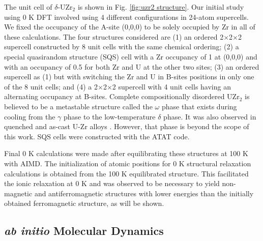 \documentclass[preprint,12pt]{elsarticle}
\begin{document}
The unit cell of $\delta$-UZr$_2$ is shown in Fig. \ref{fig:uzr2 structure}. Our initial study using 0 K DFT involved using 4 different configurations in 24-atom supercells. We fixed the occupancy of the A-site (0,0,0) to be solely occupied by Zr in all of these calculations.
The four structures considered are (1) an ordered 2$\times$2$\times$2 supercell constructed by 8 unit cells with the same chemical ordering; (2) a special quasirandom structure (SQS) cell with a Zr occupancy of 1 at (0,0,0) and with an occupancy of 0.5 for both Zr and U at the other two sites; (3) an ordered supercell as (1) but with switching the Zr and U in B-sites positions in only one of the 8 unit cells; and (4) a 2$\times$2$\times$2 supercell with 4 unit cells having an alternating occupancy at B-sites. Complete compositionally disordered UZr$_2$ is believed to be a metastable structure called the $\omega$ phase that exists during cooling from the $\gamma$ phase to the low-temperature $\delta$ phase. It was also observed in quenched and as-cast U-Zr alloys \cite{irukuvarghula_decomposition_2016}. However, that phase is beyond the scope of this work. SQS cells were constructed with the ATAT code\cite{van_de_walle_alloy_2002,van_de_walle_multicomponent_2009,van_de_walle_efficient_2013}. 

Final 0 K calculations were made after equilibrating these structures at 100 K with AIMD. The initialization of atomic positions for 0 K structural relaxation calculations is obtained from the 100 K equilibrated structure. This facilitated the ionic relaxation at 0 K and was observed to be necessary to yield non-magnetic and antiferromagnetic structures with lower energies than the initially obtained ferromagnetic structure, as will be shown. 

\subsection{\textit{ab initio} Molecular Dynamics}
\end{document}
